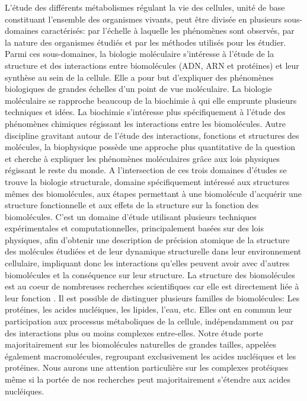 L'étude des différents métabolismes régulant la vie des cellules, unité de base constituant l'ensemble des organismes vivants, peut être divisée en plusieurs sous-domaines caractérisés: par l'échelle à laquelle les phénomènes sont observés, par la nature des organismes étudiés et par les méthodes utilisés pour les étudier. Parmi ces sous-domaines, la biologie moléculaire s'intéresse à l'étude de la structure et des interactions entre biomolécules (ADN, ARN et protéines) et leur synthèse au sein de la cellule. Elle a pour but d'expliquer des phénomènes biologiques de grandes échelles d'un point de vue moléculaire. La biologie moléculaire se rapproche beaucoup de la biochimie à qui elle emprunte plusieurs techniques et idées. La biochimie s'intéresse plus spécifiquement à l'étude des phénomènes chimiques régissant les interactions entre les biomolécules. Autre discipline gravitant autour de l'étude des interactions, fonctions et structures des molécules, la biophysique possède une approche plus quantitative de la question et cherche à expliquer les phénomènes moléculaires grâce aux lois physiques régissant le reste du monde. A l'intersection de ces trois domaines d'études se trouve la biologie structurale, domaine spécifiquement intéressé aux structures mêmes des biomolécules, aux étapes permettant à une biomolécule d'acquérir une structure fonctionnelle et aux effets de la structure sur la fonction des biomolécules. C'est un domaine d'étude utilisant plusieurs techniques expérimentales et computationnelles, principalement basées sur des lois physiques, afin d'obtenir une description de précision atomique de la structure des molécules étudiées et de leur dynamique structurelle dans leur environnement cellulaire, impliquant donc les interactions qu'elles peuvent avoir avec d'autres biomolécules et la conséquence sur leur structure. La structure des biomolécules est au coeur de nombreuses recherches scientifiques car elle est directement liée à leur fonction \cite{lodish2000molecular}.
Il est possible de distinguer plusieurs familles de biomolécules: Les protéines, les acides nucléiques, les lipides, l'eau, etc. Elles ont en commun leur participation aux processus métaboliques de la cellule, indépendamment ou par des interactions plus ou moins complexes entre-elles. Notre étude porte majoritairement sur les biomolécules naturelles de grandes tailles, appelées également macromolécules, regroupant exclusivement les acides nucléiques et les protéines. Nous aurons une attention particulière sur les complexes protéiques même si la portée de nos recherches peut majoritairement s'étendre aux acides nucléiques.

